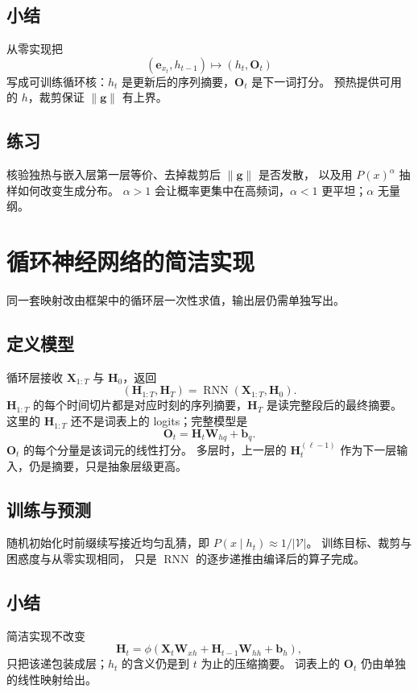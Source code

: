 \subsection{小结}

从零实现把
\[
(\bm{e}_{x_t},h_{t-1})\mapsto(h_t,\bm{O}_t)
\]
写成可训练循环核：$h_t$ 是更新后的序列摘要，$\bm{O}_t$ 是下一词打分。
预热提供可用的 $h$，裁剪保证 $\|\bm{g}\|$ 有上界。

\subsection{练习}

核验独热与嵌入层第一层等价、去掉裁剪后 $\|\bm{g}\|$ 是否发散，
以及用 $P(x)^\alpha$ 抽样如何改变生成分布。
$\alpha>1$ 会让概率更集中在高频词，$\alpha<1$ 更平坦；$\alpha$ 无量纲。

\section{循环神经网络的简洁实现}

同一套映射改由框架中的循环层一次性求值，输出层仍需单独写出。

\subsection{定义模型}

循环层接收 $\bm{X}_{1:T}$ 与 $\bm{H}_0$，返回
\[
(\bm{H}_{1:T},\bm{H}_T)
=
\operatorname{RNN}(\bm{X}_{1:T},\bm{H}_0).
\]
$\bm{H}_{1:T}$ 的每个时间切片都是对应时刻的序列摘要，$\bm{H}_T$ 是读完整段后的最终摘要。
这里的 $\bm{H}_{1:T}$ 还不是词表上的 logits；完整模型是
\[
\bm{O}_t=\bm{H}_t\bm{W}_{hq}+\bm{b}_q.
\]
$\bm{O}_t$ 的每个分量是该词元的线性打分。
多层时，上一层的 $\bm{H}_t^{(\ell-1)}$ 作为下一层输入，仍是摘要，只是抽象层级更高。

\subsection{训练与预测}

随机初始化时前缀续写接近均匀乱猜，即 $P(x\mid h_t)\approx 1/|\mathcal{V}|$。
训练目标、裁剪与困惑度与从零实现相同，
只是 $\operatorname{RNN}$ 的逐步递推由编译后的算子完成。

\subsection{小结}

简洁实现不改变
\[
\bm{H}_t=\phi(\bm{X}_t\bm{W}_{xh}+\bm{H}_{t-1}\bm{W}_{hh}+\bm{b}_h),
\]
只把该递包装成层；$h_t$ 的含义仍是到 $t$ 为止的压缩摘要。
词表上的 $\bm{O}_t$ 仍由单独的线性映射给出。

